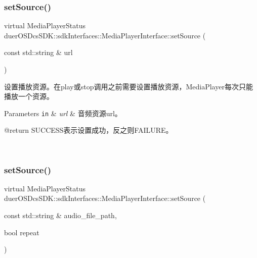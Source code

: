 \subsubsection{\texorpdfstring{set\+Source()}{setSource()}\hspace{0.1cm}{\footnotesize\ttfamily [2/3]}}
{\footnotesize\ttfamily virtual Media\+Player\+Status duer\+O\+S\+Dcs\+S\+D\+K\+::sdk\+Interfaces\+::\+Media\+Player\+Interface\+::set\+Source (\begin{DoxyParamCaption}\item[{const std\+::string \&}]{url }\end{DoxyParamCaption})\hspace{0.3cm}{\ttfamily [pure virtual]}}



设置播放资源。在play或stop调用之前需要设置播放资源，\+Media\+Player每次只能播放一个资源。 


\begin{DoxyParams}[1]{Parameters}
\mbox{\tt in}  & {\em url} & 音频资源url。 \begin{DoxyVerb}@return SUCCESS表示设置成功，反之则FAILURE。\end{DoxyVerb}
 \\
\hline
\end{DoxyParams}
\mbox{\label{classduerOSDcsSDK_1_1sdkInterfaces_1_1MediaPlayerInterface_a0fb29a6364ca2586ea0328f52f19ed1a}} 
\subsubsection{\texorpdfstring{set\+Source()}{setSource()}\hspace{0.1cm}{\footnotesize\ttfamily [3/3]}}
{\footnotesize\ttfamily virtual Media\+Player\+Status duer\+O\+S\+Dcs\+S\+D\+K\+::sdk\+Interfaces\+::\+Media\+Player\+Interface\+::set\+Source (\begin{DoxyParamCaption}\item[{const std\+::string \&}]{audio\+\_\+file\+\_\+path,  }\item[{bool}]{repeat }\end{DoxyParamCaption})\hspace{0.3cm}{\ttfamily [pure virtual]}}



